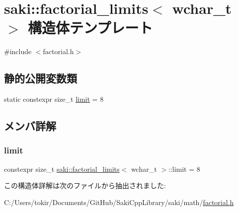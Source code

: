 \hypertarget{structsaki_1_1factorial__limits_3_01wchar__t_01_4}{}\section{saki\+:\+:factorial\+\_\+limits$<$ wchar\+\_\+t $>$ 構造体テンプレート}
\label{structsaki_1_1factorial__limits_3_01wchar__t_01_4}


{\ttfamily \#include $<$factorial.\+h$>$}

\subsection*{静的公開変数類}
\begin{DoxyCompactItemize}
\item 
static constexpr size\+\_\+t \mbox{\hyperlink{structsaki_1_1factorial__limits_3_01wchar__t_01_4_ab3b034cf7691d44b603fa5d4bef8e363}{limit}} = 8
\end{DoxyCompactItemize}


\subsection{メンバ詳解}
\mbox{\label{structsaki_1_1factorial__limits_3_01wchar__t_01_4_ab3b034cf7691d44b603fa5d4bef8e363}} 
\subsubsection{\texorpdfstring{limit}{limit}}
{\footnotesize\ttfamily constexpr size\+\_\+t \mbox{\hyperlink{structsaki_1_1factorial__limits}{saki\+::factorial\+\_\+limits}}$<$ wchar\+\_\+t $>$\+::limit = 8\hspace{0.3cm}{\ttfamily [static]}}



この構造体詳解は次のファイルから抽出されました\+:\begin{DoxyCompactItemize}
\item 
C\+:/\+Users/tokir/\+Documents/\+Git\+Hub/\+Saki\+Cpp\+Library/saki/math/\mbox{\hyperlink{factorial_8h}{factorial.\+h}}\end{DoxyCompactItemize}
